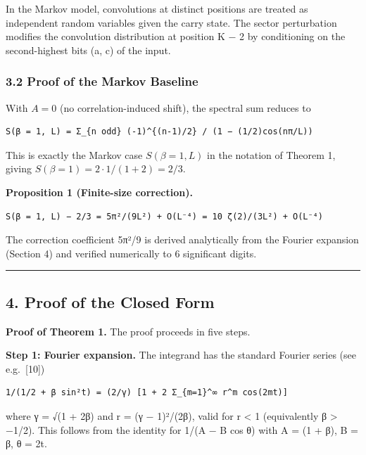 \documentclass[
  11pt,
]{article}
\begin{document}
In the Markov model, convolutions at distinct positions are treated as
independent random variables given the carry state. The sector perturbation
modifies the convolution distribution at position K − 2 by conditioning on the
second-highest bits (a, c) of the input.

\subsubsection{3.2 Proof of the Markov
Baseline}\label{proof-of-the-markov-baseline}

With \(A = 0\) (no correlation-induced shift), the spectral sum reduces to

\begin{verbatim}
S(β = 1, L) = Σ_{n odd} (-1)^{(n-1)/2} / (1 − (1/2)cos(nπ/L))
\end{verbatim}

This is exactly the Markov case \(S(\beta = 1, L)\) in the notation of Theorem
1, giving \(S(\beta = 1) = 2\cdot 1/(1+2) = 2/3\).

\textbf{Proposition 1 (Finite-size correction).}

\begin{verbatim}
S(β = 1, L) − 2/3 = 5π²/(9L²) + O(L⁻⁴) = 10 ζ(2)/(3L²) + O(L⁻⁴)
\end{verbatim}

The correction coefficient 5π²/9 is derived analytically from the Fourier
expansion (Section 4) and verified numerically to 6 significant digits.

\begin{center}\rule{0.5\linewidth}{0.5pt}\end{center}

\newpage

\subsection{4. Proof of the Closed Form}\label{proof-of-the-closed-form}

\textbf{Proof of Theorem 1.} The proof proceeds in five steps.

\textbf{Step 1: Fourier expansion.} The integrand has the standard Fourier
series (see e.g.~{[}10{]})

\begin{verbatim}
1/(1/2 + β sin²t) = (2/γ) [1 + 2 Σ_{m=1}^∞ r^m cos(2mt)]
\end{verbatim}

where γ = √(1 + 2β) and r = (γ − 1)²/(2β), valid for \textbar r\textbar{}
\textless{} 1 (equivalently β \textgreater{} −1/2). This follows from the
identity for 1/(A − B cos θ) with A = (1 + β), B = β, θ = 2t.
\end{document}
